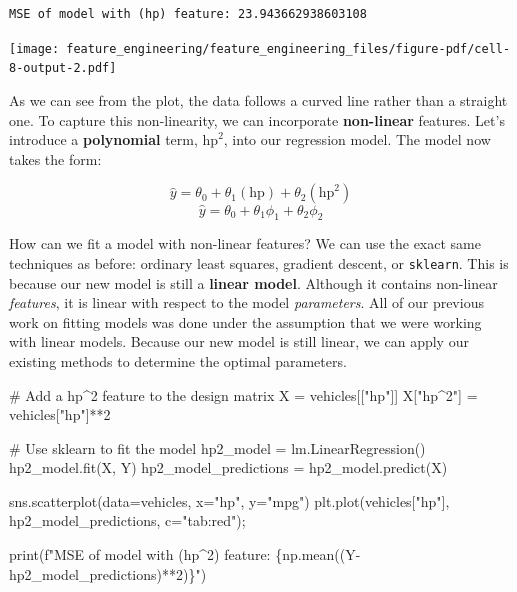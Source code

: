 \documentclass[
  letterpaper,
  DIV=11,
  numbers=noendperiod]{scrreprt}
\newenvironment{Shaded}{\begin{snugshade}}{\end{snugshade}}
\newcommand{\BuiltInTok}[1]{\textcolor[rgb]{0.00,0.23,0.31}{#1}}
\newcommand{\CommentTok}[1]{\textcolor[rgb]{0.37,0.37,0.37}{#1}}
\newcommand{\DecValTok}[1]{\textcolor[rgb]{0.68,0.00,0.00}{#1}}
\newcommand{\NormalTok}[1]{\textcolor[rgb]{0.00,0.23,0.31}{#1}}
\newcommand{\OperatorTok}[1]{\textcolor[rgb]{0.37,0.37,0.37}{#1}}
\newcommand{\SpecialCharTok}[1]{\textcolor[rgb]{0.37,0.37,0.37}{#1}}
\newcommand{\SpecialStringTok}[1]{\textcolor[rgb]{0.13,0.47,0.30}{#1}}
\newcommand{\StringTok}[1]{\textcolor[rgb]{0.13,0.47,0.30}{#1}}
\begin{document}
\begin{verbatim}
MSE of model with (hp) feature: 23.943662938603108
\end{verbatim}

\texttt{[image: feature\_engineering/feature\_engineering\_files/figure-pdf/cell-8-output-2.pdf]}

As we can see from the plot, the data follows a curved line rather than
a straight one. To capture this non-linearity, we can incorporate
\textbf{non-linear} features. Let's introduce a \textbf{polynomial}
term, \(\text{hp}^2\), into our regression model. The model now takes
the form:

\[\hat{y} = \theta_0 + \theta_1 (\text{hp}) + \theta_2 (\text{hp}^2)\]
\[\hat{y} = \theta_0 + \theta_1 \phi_1 + \theta_2 \phi_2\]

How can we fit a model with non-linear features? We can use the exact
same techniques as before: ordinary least squares, gradient descent, or
\texttt{sklearn}. This is because our new model is still a
\textbf{linear model}. Although it contains non-linear \emph{features},
it is linear with respect to the model \emph{parameters}. All of our
previous work on fitting models was done under the assumption that we
were working with linear models. Because our new model is still linear,
we can apply our existing methods to determine the optimal parameters.

\begin{Shaded}
\begin{Highlighting}[]
\CommentTok{\# Add a hp\^{}2 feature to the design matrix}
\NormalTok{X }\OperatorTok{=}\NormalTok{ vehicles[[}\StringTok{"hp"}\NormalTok{]]}
\NormalTok{X[}\StringTok{"hp\^{}2"}\NormalTok{] }\OperatorTok{=}\NormalTok{ vehicles[}\StringTok{"hp"}\NormalTok{]}\OperatorTok{**}\DecValTok{2}

\CommentTok{\# Use sklearn to fit the model}
\NormalTok{hp2\_model }\OperatorTok{=}\NormalTok{ lm.LinearRegression()}
\NormalTok{hp2\_model.fit(X, Y)}
\NormalTok{hp2\_model\_predictions }\OperatorTok{=}\NormalTok{ hp2\_model.predict(X)}

\NormalTok{sns.scatterplot(data}\OperatorTok{=}\NormalTok{vehicles, x}\OperatorTok{=}\StringTok{"hp"}\NormalTok{, y}\OperatorTok{=}\StringTok{"mpg"}\NormalTok{)}
\NormalTok{plt.plot(vehicles[}\StringTok{"hp"}\NormalTok{], hp2\_model\_predictions, c}\OperatorTok{=}\StringTok{"tab:red"}\NormalTok{)}\OperatorTok{;}

\BuiltInTok{print}\NormalTok{(}\SpecialStringTok{f"MSE of model with (hp\^{}2) feature: }\SpecialCharTok{\{}\NormalTok{np}\SpecialCharTok{.}\NormalTok{mean((Y}\OperatorTok{{-}}\NormalTok{hp2\_model\_predictions)}\OperatorTok{**}\DecValTok{2}\NormalTok{)}\SpecialCharTok{\}}\SpecialStringTok{"}\NormalTok{)}
\end{Highlighting}
\end{Shaded}
\end{document}
